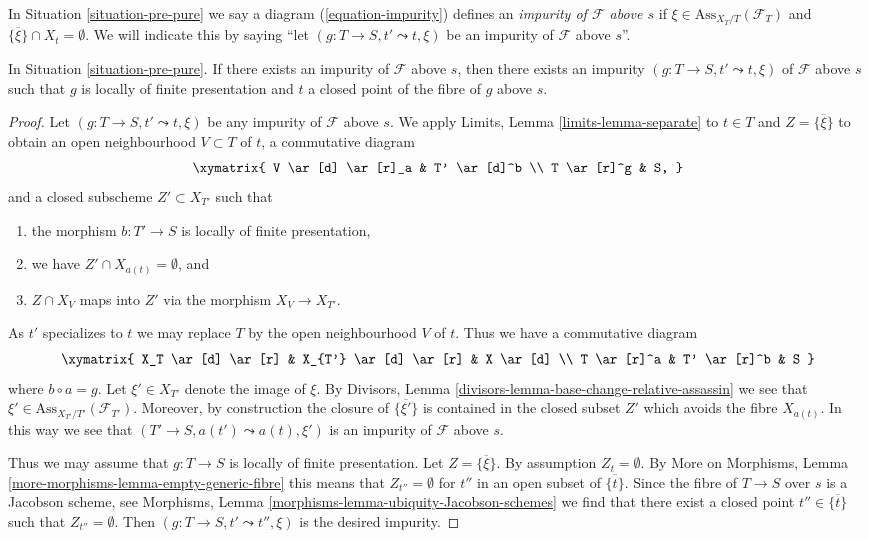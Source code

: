 \begin{definition}
\label{definition-impurity}
In
Situation \ref{situation-pre-pure}
we say a diagram (\ref{equation-impurity}) defines an
{\it impurity of $\mathcal{F}$ above $s$}
if $\xi \in \text{Ass}_{X_T/T}(\mathcal{F}_T)$ and
$\overline{\{\xi\}} \cap X_t = \emptyset$. We will indicate
this by saying ``let $(g : T \to S, t' \leadsto t, \xi)$ be
an impurity of $\mathcal{F}$ above $s$''.
\end{definition}

\begin{lemma}
\label{lemma-impure-finite-presentation}
In Situation \ref{situation-pre-pure}.
If there exists an impurity of $\mathcal{F}$ above $s$, then
there exists an impurity $(g : T \to S, t' \leadsto t, \xi)$
of $\mathcal{F}$ above $s$ such that $g$ is locally of finite
presentation and $t$ a closed point of the fibre of $g$ above $s$.
\end{lemma}

\begin{proof}
Let $(g : T \to S, t' \leadsto t, \xi)$ be any impurity of
$\mathcal{F}$ above $s$. We apply
Limits, Lemma \ref{limits-lemma-separate}
to $t \in T$ and $Z = \overline{\{\xi\}}$ to obtain an open neighbourhood
$V \subset T$ of $t$, a commutative diagram
$$
\xymatrix{
V \ar[d] \ar[r]_a & T' \ar[d]^b \\
T \ar[r]^g & S,
}
$$
and a closed subscheme $Z' \subset X_{T'}$ such that
\begin{enumerate}
\item the morphism $b : T' \to S$ is locally of finite presentation,
\item we have $Z' \cap X_{a(t)} = \emptyset$, and
\item $Z \cap X_V$ maps into $Z'$ via the morphism $X_V \to X_{T'}$.
\end{enumerate}
As $t'$ specializes to $t$ we may replace $T$ by the open neighbourhood
$V$ of $t$. Thus we have a commutative diagram
$$
\xymatrix{
X_T \ar[d] \ar[r] &
X_{T'} \ar[d] \ar[r] &
X \ar[d] \\
T \ar[r]^a & T' \ar[r]^b & S
}
$$
where $b \circ a = g$. Let $\xi' \in X_{T'}$ denote the
image of $\xi$. By
Divisors, Lemma \ref{divisors-lemma-base-change-relative-assassin}
we see that $\xi' \in \text{Ass}_{X_{T'}/T'}(\mathcal{F}_{T'})$.
Moreover, by construction the closure of $\overline{\{\xi'\}}$
is contained in the closed subset $Z'$ which avoids the fibre
$X_{a(t)}$. In this way we see that $(T' \to S, a(t') \leadsto a(t), \xi')$
is an impurity of $\mathcal{F}$ above $s$.

\medskip\noindent
Thus we may assume that $g : T \to S$ is locally of finite presentation.
Let $Z = \overline{\{\xi\}}$. By assumption $Z_t = \emptyset$. By
More on Morphisms, Lemma \ref{more-morphisms-lemma-empty-generic-fibre}
this means that $Z_{t''} = \emptyset$ for $t''$ in an open subset
of $\overline{\{t\}}$. Since the fibre of
$T \to S$ over $s$ is a Jacobson scheme, see
Morphisms, Lemma \ref{morphisms-lemma-ubiquity-Jacobson-schemes}
we find that there exist a closed point $t'' \in \overline{\{t\}}$ such that
$Z_{t''} = \emptyset$. Then $(g : T \to S, t' \leadsto t'', \xi)$ is the
desired impurity.
\end{proof}

